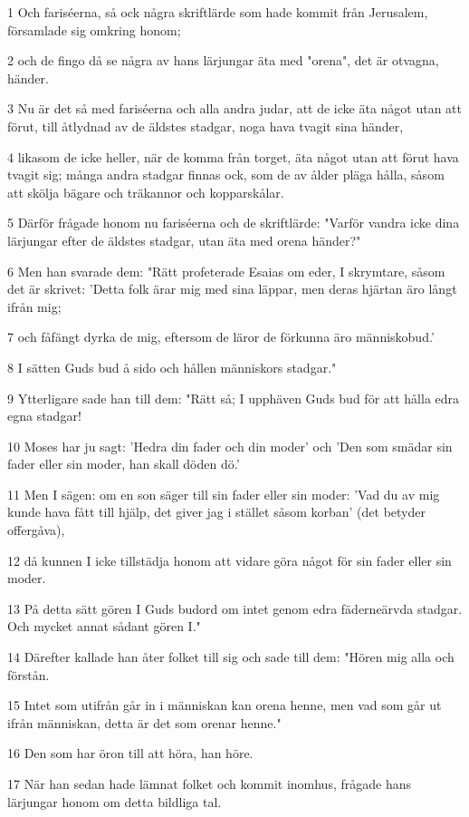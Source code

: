 \par 1 Och fariséerna, så ock några skriftlärde som hade kommit från Jerusalem, församlade sig omkring honom;
\par 2 och de fingo då se några av hans lärjungar äta med "orena", det är otvagna, händer.
\par 3 Nu är det så med fariséerna och alla andra judar, att de icke äta något utan att förut, till åtlydnad av de äldstes stadgar, noga hava tvagit sina händer,
\par 4 likasom de icke heller, när de komma från torget, äta något utan att förut hava tvagit sig; många andra stadgar finnas ock, som de av ålder pläga hålla, såsom att skölja bägare och träkannor och kopparskålar.
\par 5 Därför frågade honom nu fariséerna och de skriftlärde: "Varför vandra icke dina lärjungar efter de äldstes stadgar, utan äta med orena händer?"
\par 6 Men han svarade dem: "Rätt profeterade Esaias om eder, I skrymtare, såsom det är skrivet: 'Detta folk ärar mig med sina läppar, men deras hjärtan äro långt ifrån mig;
\par 7 och fåfängt dyrka de mig, eftersom de läror de förkunna äro människobud.'
\par 8 I sätten Guds bud å sido och hållen människors stadgar."
\par 9 Ytterligare sade han till dem: "Rätt så; I upphäven Guds bud för att hålla edra egna stadgar!
\par 10 Moses har ju sagt: 'Hedra din fader och din moder' och 'Den som smädar sin fader eller sin moder, han skall döden dö.'
\par 11 Men I sägen: om en son säger till sin fader eller sin moder: 'Vad du av mig kunde hava fått till hjälp, det giver jag i stället såsom korban' (det betyder offergåva),
\par 12 då kunnen I icke tillstädja honom att vidare göra något för sin fader eller sin moder.
\par 13 På detta sätt gören I Guds budord om intet genom edra fäderneärvda stadgar. Och mycket annat sådant gören I."
\par 14 Därefter kallade han åter folket till sig och sade till dem: "Hören mig alla och förstån.
\par 15 Intet som utifrån går in i människan kan orena henne, men vad som går ut ifrån människan, detta är det som orenar henne."
\par 16 Den som har öron till att höra, han höre.
\par 17 När han sedan hade lämnat folket och kommit inomhus, frågade hans lärjungar honom om detta bildliga tal.
